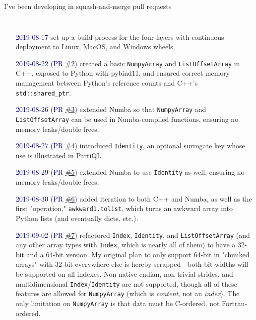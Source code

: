 \documentclass[aspectratio=169]{beamer}
\begin{document}
\begin{frame}{I've been developing in squash-and-merge pull requests}
\vspace{0.25 cm}
\tiny
\begin{columns}
\begin{itemize}
\item[\textcolor{darkblue}{2019-08-17}] set up a build process for the four layers with continuous deployment to Linux, MacOS, and Windows wheels.
\item[\textcolor{darkblue}{2019-08-22 (PR \href{https://github.com/scikit-hep/awkward-1.0/pull/2}{\#2})}] created a basic \texttt{NumpyArray} and \texttt{ListOffsetArray} in C++, exposed to Python with pybind11, and ensured correct memory management between Python's reference counts and C++'s \texttt{std::shared_ptr}.
\item[\textcolor{darkblue}{2019-08-26 (PR \href{https://github.com/scikit-hep/awkward-1.0/pull/3}{\#3})}] extended Numba so that \texttt{NumpyArray} and \texttt{ListOffsetArray} can be used in Numba-compiled functions, ensuring no memory leaks/double frees.
\item[\textcolor{darkblue}{2019-08-27 (PR \href{https://github.com/scikit-hep/awkward-1.0/pull/4}{\#4})}] introduced \texttt{Identity}, an optional surrogate key whose use is illustrated in \href{https://github.com/jpivarski/PartiQL\#readme}{PartiQL}.
\item[\textcolor{darkblue}{2019-08-29 (PR \href{https://github.com/scikit-hep/awkward-1.0/pull/5}{\#5})}] extended Numba to use \texttt{Identity} as well, ensuring no memory leaks/double frees.
\item[\textcolor{darkblue}{2019-08-30 (PR \href{https://github.com/scikit-hep/awkward-1.0/pull/6}{\#6})}] added iteration to both C++ and Numba, as well as the first "operation," \texttt{awkward1.tolist}, which turns an awkward array into Python lists (and eventually dicts, etc.).
\item[\textcolor{darkblue}{2019-09-02 (PR \href{https://github.com/scikit-hep/awkward-1.0/pull/7}{\#7})}] refactored \texttt{Index}, \texttt{Identity}, and \texttt{ListOffsetArray} (and any other array types with \texttt{Index}, which is nearly all of them) to have a 32-bit and a 64-bit version. My original plan to only support 64-bit in "chunked arrays" with 32-bit everywhere else is hereby scrapped—both bit widths will be supported on all indexes. Non-native endian, non-trivial strides, and multidimensional \texttt{Index}/\texttt{Identity} are not supported, though all of these features are allowed for \texttt{NumpyArray} (which is {\it content}, not an {\it index}). The only limitation on \texttt{NumpyArray} is that data must be C-ordered, not Fortran-ordered.

\end{itemize}
\end{columns}
\end{frame}
\end{document}
